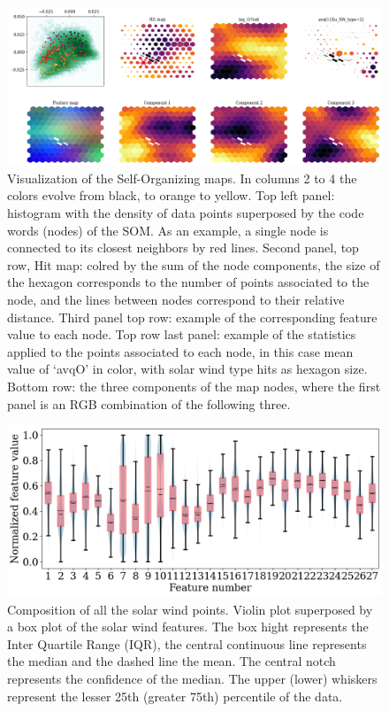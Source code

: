 \documentclass[utf8]{frontiersSCNS} %
\begin{document}
\begin{figure}[h!]
	\begin{center}
		\includegraphics[width=16cm]{Amaya/maps}%
	\end{center}
	\caption{Visualization of the Self-Organizing maps. In columns 2 to 4 the colors evolve from black, to orange to yellow. Top left panel: histogram with the density of data points superposed by the code words (nodes) of the SOM. As an example, a single node is connected to its closest neighbors by red lines. Second panel, top row, Hit map: colred by the sum of the node components, the size of the hexagon corresponds to the number of points associated to the node, and the lines between nodes correspond to their relative distance. Third panel top row: example of the corresponding feature value to each node. Top row last panel: example of the statistics applied to the points associated to each node, in this case mean value of `avqO' in color, with solar wind type hits as hexagon size. Bottom row: the three components of the map nodes, where the first panel is an RGB combination of the following three.}\label{fig:maps}
\end{figure}

\begin{figure}[h!]
	\begin{center}
		\includegraphics[width=13cm]{Amaya/datarange}%
	\end{center}
	\caption{Composition of all the solar wind points. Violin plot superposed by a box plot of the solar wind features. The box hight represents the Inter Quartile Range (IQR), the central continuous line represents the median and the dashed line the mean. The central notch represents the confidence of the median. The upper (lower) whiskers represent the lesser 25th (greater 75th) percentile of the data. }\label{fig:datarange}
\end{figure}
\end{document}
